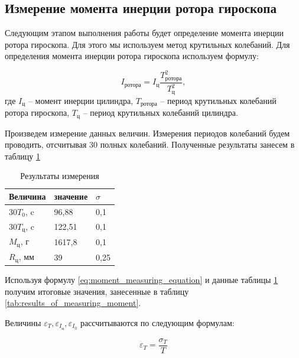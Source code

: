 \documentclass[12pt,a4paper]{article}
\begin{document}
\newpage

\subsection{Измерение момента инерции ротора гироскопа}

Следующим этапом выполнения работы будет определение момента инерции ротора гироскопа. Для этого мы используем метод крутильных колебаний. Для определения момента инерции ротора гироскопа используем формулу:

\begin{equation}
	I_{\text{ротора}}= I_{\text{ц}}\frac{T_{\text{ротора}}^2}{T_{\text{ц}}^2},
	\label{eq:moment_measuring_equation}
\end{equation}
где $I_{\text{ц}}$ -- момент инерции цилиндра, $T_{\text{ротора}}$ -- период крутильных колебаний ротора гироскопа, $T_{\text{ц}}$ -- период крутильных колебаний цилиндра.

Произведем измерение данных величин.
Измерения периодов колебаний будем проводить, отсчитывая 30 полных колебаний. Полученные результаты занесем в таблицу \ref{tab:results_of_measuring}

\begin{table}[h!]
	\centering
		\begin{tabular}{|l|l|l|}
			\hline
			Величина 			 & значение & $\sigma$    \\ \hline
			$30T_{0}$, c  			 & 96,88    & 0,1         \\ \hline
			$30T_{\text{ц}}$, c  			 & 122,51   & 0,1         \\ \hline
			$M_{\text{ц}}$, г    & 1617,8   & 0,1         \\ \hline
			$R_{\text{ц}}$, мм   & 39       & 0,25        \\ \hline
		\end{tabular}
		\caption{Результаты измерения}
		\label{tab:results_of_measuring}
\end{table}

Используя формулу \ref{eq:moment_measuring_equation} и данные таблицы \ref{tab:results_of_measuring} получим итоговые значения, занесенные в таблицу \ref{tab:results_of_measuring_moment}.

Величины $\varepsilon_{T}, \varepsilon_{I_{\text{ц}}}, \varepsilon_{I_{0}}$ рассчитываются по следующим формулам:

\begin{equation}
	\varepsilon_{T} = \frac{\sigma_{T}}{T}
\end{equation}	
\end{document}
